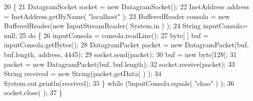 \begin{DoxyCode}
20                                                                \{
21         DatagramSocket socket = \textcolor{keyword}{new} DatagramSocket();
22         InetAddress address = InetAddress.getByName( \textcolor{stringliteral}{"localhost"} );
23         BufferedReader consola = \textcolor{keyword}{new} BufferedReader(\textcolor{keyword}{new} InputStreamReader( System.in ) );
24         String inputConsola= null;
25         \textcolor{keywordflow}{do} \{
26             inputConsola = consola.readLine();
27             byte[ ] buf = inputConsola.getBytes();
28             DatagramPacket packet = \textcolor{keyword}{new} DatagramPacket(buf, buf.length, address, 4445);
29             socket.send(packet);
30             buf = \textcolor{keyword}{new} byte[128];
31             packet = \textcolor{keyword}{new} DatagramPacket(buf, buf.length);
32             socket.receive(packet);
33             String received = \textcolor{keyword}{new} String(packet.getData( ) );
34             System.out.println(received);
35         \} \textcolor{keywordflow}{while} (!inputConsola.equals( \textcolor{stringliteral}{"chao"} ) );
36         socket.close( );
37      \} 
\end{DoxyCode}
